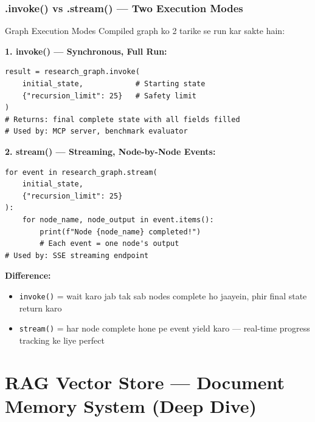 \documentclass[11pt,a4paper,twoside]{report}
\begin{document}
\subsection{.invoke() vs .stream() --- Two Execution Modes}

\begin{conceptbox}{Graph Execution Modes}
Compiled graph ko 2 tarike se run kar sakte hain:

\textbf{1. invoke() --- Synchronous, Full Run:}
\begin{lstlisting}[style=pythonstyle]
result = research_graph.invoke(
    initial_state,            # Starting state
    {"recursion_limit": 25}   # Safety limit
)
# Returns: final complete state with all fields filled
# Used by: MCP server, benchmark evaluator
\end{lstlisting}

\textbf{2. stream() --- Streaming, Node-by-Node Events:}
\begin{lstlisting}[style=pythonstyle]
for event in research_graph.stream(
    initial_state,
    {"recursion_limit": 25}
):
    for node_name, node_output in event.items():
        print(f"Node {node_name} completed!")
        # Each event = one node's output
# Used by: SSE streaming endpoint
\end{lstlisting}

\textbf{Difference:}
\begin{itemize}
    \item \texttt{invoke()} = wait karo jab tak sab nodes complete ho jaayein, phir final state return karo
    \item \texttt{stream()} = har node complete hone pe event yield karo --- real-time progress tracking ke liye perfect
\end{itemize}
\end{conceptbox}



\chapter{RAG Vector Store --- Document Memory System (Deep Dive)}
\end{document}
